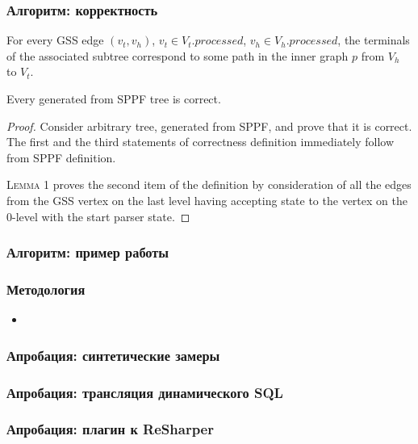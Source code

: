\documentclass{beamer}
\begin{document}
\begin{frame}
    \transwipe[direction=90]
    \frametitle{Алгоритм: корректность}
        \begin{theorem}
    For every GSS edge $(v_{t}, v_{h})$, $v_{t} \in V_{t}.processed$, $v_{h} \in V_{h}.processed$, 
the terminals of the associated subtree correspond to some path in the inner graph $p$ 
from $V_{h}$ to $V_{t}$.
    \end{theorem}

    \begin{theorem}
       Every generated from SPPF tree is correct.
    \end{theorem}

    \begin{proof}
      Consider arbitrary tree, generated from SPPF, and prove that it is correct. The first and the third statements
of correctness definition immediately follow from SPPF definition. 

\textsc{Lemma 1} proves the second item of the definition by consideration of all the edges from the GSS vertex
on the last level having accepting state to the vertex on the 0-level with the start parser state.

    \end{proof}

\end{frame}

\begin{frame}
    \transwipe[direction=90]
    \frametitle{Алгоритм: пример работы}
\end{frame}

\begin{frame}[t]
    \transwipe[direction=90]
    \frametitle{Методология}
    \begin{itemize}
        \item
    \end{itemize}
\end{frame}

\begin{frame}[t]
    \transwipe[direction=90]
    \frametitle{Апробация: синтетические замеры}
\end{frame}

\begin{frame}[t]
    \transwipe[direction=90]
    \frametitle{Апробация: трансляция динамического SQL}
\end{frame}

\begin{frame}[t]
    \transwipe[direction=90]
    \frametitle{Апробация: плагин к ReSharper}
\end{frame}
\end{document}
